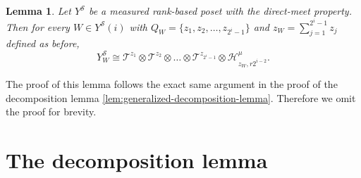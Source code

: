 \documentclass[10pt,a4paper]{article}
\newcommand{\prettyref}[1]{\cref{#1}}
\newtheorem{lemma}[theorem]{Lemma}
\theoremstyle{definition}
\theoremstyle{remark}
\newcommand{\set}[1]{\{#1\}}
\numberwithin{equation}{section}
\let\pref=\prettyref
\def\Y{Y}
\begin{document}
\begin{lemma}
  Let \(\Y^{\mathcal{S}}\) be a measured rank-based poset with the direct-meet property. Then for every \(W \in \Y^{\mathcal{S}}(i)\) with \(Q_W = \set{z_1,z_2,\dots,z_{2^i-1}}\) and \(z_W= \sum_{j=1}^{2^i-1} z_j\) defined as before,
  \[\Y^{\mathcal{S}}_W \cong \mathcal{T}^{z_1} \otimes \mathcal{T}^{z_2} \otimes \dots \otimes \mathcal{T}^{z_{2^i-1}} \otimes \mathcal{H}^{\mu}_{z_W,r2^{i-2}}.\]
\end{lemma}
The proof of this lemma follows the exact same argument in the proof of the decomposition lemma \pref{lem:generalized-decomposition-lemma}. Therefore we omit the proof for brevity.


\appendix
\section{The decomposition lemma} \label{app:loc-to-glob}
\end{document}
